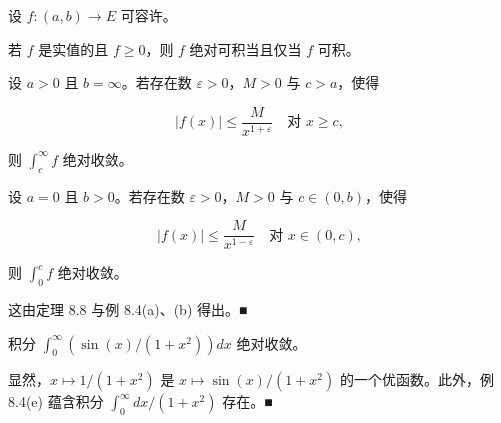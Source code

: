 \begin{example}

设 $ f : (a, b) \to E $ 可容许。

\begin{items}
\item

若 $ f $ 是实值的且 $ f \ge 0 $，则 $ f $ 绝对可积当且仅当 $ f $ 可积。

\item

\begin{subitems}
\item

设 $ a > 0 $ 且 $ b = \infty $。若存在数 $ \varepsilon > 0 $，$ M > 0 $ 与 $ c > a $，使得

\[
\left| f(x) \right| \le \frac{M}{x^{1+\varepsilon}} \quad \text{对 } x \ge c ,
\]

则 $ \int_{c}^{\infty} f $ 绝对收敛。

\item

设 $ a = 0 $ 且 $ b > 0 $。若存在数 $ \varepsilon > 0 $，$ M > 0 $ 与 $ c \in (0, b) $，使得

\[
\left| f(x) \right| \le \frac{M}{x^{1-\varepsilon}} \quad \text{对 } x \in (0, c) ,
\]

则 $ \int_{0}^{c} f $ 绝对收敛。

\proofhead
这由定理 8.8 与例 8.4(a)、(b) 得出。\nobreak\hspace{0.35em}■
\end{subitems}

\item

积分 $ \int_{0}^{\infty} \left( \sin(x)/(1 + x^{2}) \right) dx $ 绝对收敛。

\proofhead
显然，$ x \mapsto 1/(1 + x^{2}) $ 是 $ x \mapsto \sin(x)/(1 + x^{2}) $ 的一个优函数。此外，例 8.4(e) 蕴含积分 $ \int_{0}^{\infty} dx/(1 + x^{2}) $ 存在。\nobreak\hspace{0.35em}■
\end{items}

\end{example}

